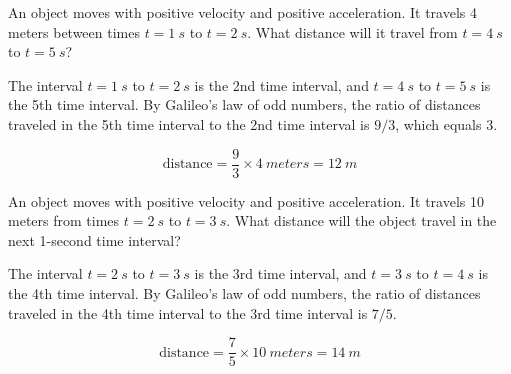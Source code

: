 \documentclass[answers]{exam}
\begin{document}
\begin{center}
\end{center}

\begin{questions}
\question
An object moves with positive velocity and positive acceleration. It travels 4 meters between times $t = \SI{1}{s}$ to $t = \SI{2}{s}$. What distance will it travel from $t = \SI{4}{s}$ to $t = \SI{5}{s}$?

\begin{solution}
The interval $t = \SI{1}{s}$ to $t = \SI{2}{s}$ is the 2nd time interval, and $t = \SI{4}{s}$ to $t = \SI{5}{s}$ is the 5th time interval. By Galileo's law of odd numbers, the ratio of distances traveled in the 5th time interval to the 2nd time interval is $9/3$, which equals 3. 

\begin{equation*}
    \text{distance} = \frac{9}{3} \times \SI{4}{meters} = \boxed{\SI{12}{m}}
\end{equation*}
\end{solution}

\question
An object moves with positive velocity and positive acceleration. It travels 10 meters from times $t = \SI{2}{s}$ to $t = \SI{3}{s}$. What distance will the object travel in the next 1-second time interval?

\begin{solution}
The interval $t = \SI{2}{s}$ to $t = \SI{3}{s}$ is the 3rd time interval, and $t = \SI{3}{s}$ to $t = \SI{4}{s}$ is the 4th time interval. By Galileo's law of odd numbers, the ratio of distances traveled in the 4th time interval to the 3rd time interval is $7/5$.

\begin{equation*}
    \text{distance} = \frac{7}{5} \times \SI{10}{meters} = \boxed{\SI{14}{m}}
\end{equation*}
\end{solution}



\end{questions}
\end{document}
